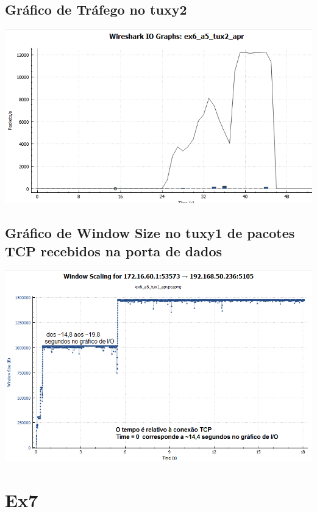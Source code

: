 \documentclass[11pt,a4paper,reqno]{report}
\numberwithin{equation}{section}
\begin{document}
\begin{appendices}
\subsection{Gráfico de Tráfego no tuxy2}
\label{ex6_a5_2io}
\includegraphics[width=18cm]{ex6_a5_tux2_IO.png}

\subsection{Gráfico de Window Size no tuxy1 de pacotes TCP recebidos na porta de dados}
\label{ex6_window}
\includegraphics[width=18cm]{ex6_tux1_window.png}

\section{Ex7}%


\end{appendices}
\end{document}
